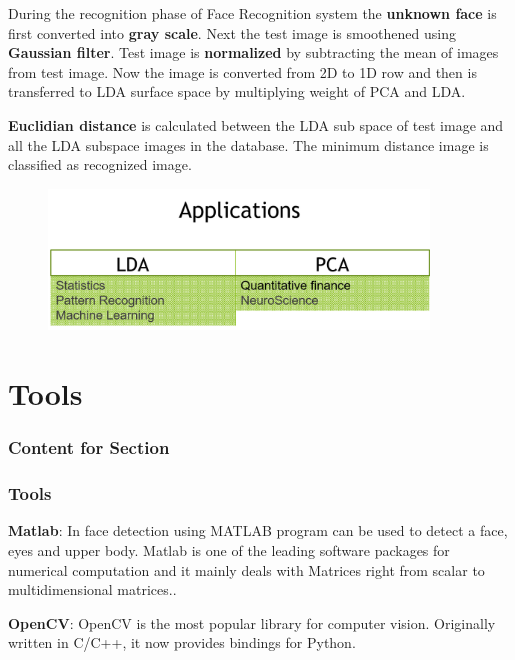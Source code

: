 \documentclass[xcolor=dvipsnames]{beamer}
\begin{document}
     \begin{frame}
    During the recognition phase of Face Recognition system the \textbf{unknown face} is first converted into \textbf{gray scale}. Next the test image is smoothened using \textbf{Gaussian filter}. Test image is \textbf{normalized} by subtracting the mean of images from test image. Now the image is converted from 2D to 1D row and then is transferred to LDA surface space by multiplying weight of PCA and LDA. \newline 

\textbf{Euclidian distance} is calculated between the LDA sub space of test image and all the LDA subspace images in the database. The minimum distance image is classified as recognized image.
       \end{frame}
       
    \begin{frame}
    \begin{figure}[H]
        \graphicspath{{figs/}}
        \includegraphics[width=0.9\textwidth]{img6.png}
    \end{figure}
    \end{frame}
    
    \section{Tools}
    \begin{frame}
      \frametitle{Content for Section \thesection}
      \tableofcontents[currentsection]
    \end{frame}
    
    \begin{frame}
        \frametitle{Tools}
    \textbf{Matlab}: In face detection using MATLAB program can be used to detect a face, eyes and upper body. Matlab is one of the leading software packages for numerical computation and it mainly deals with Matrices right from scalar to multidimensional matrices.. \newline

\textbf{OpenCV}: OpenCV is the most popular library for computer vision. Originally written in C/C++, it now provides bindings for Python.
    \end{frame}
    
\end{document}
